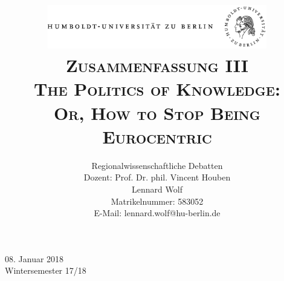 \documentclass[a4paper, 12pt]{article}
\date{\vspace{-3ex}}
\begin{document}
\title{\vspace{5ex}
	\includegraphics*[bb=0 0 720 200, width=0.72\textwidth]{ErstesSem/images/hu_logo.png}\\
	\vspace{30pt}
	\scshape\LARGE{Zusammenfassung III}\\\Large{The Politics of Knowledge:\\Or, How to Stop Being Eurocentric}\vspace{20pt}}
	


\author{Regionalwissenschaftliche Debatten\\
	\vspace{7pt}
          Dozent: Prof. Dr. phil. Vincent Houben\\\vspace{4pt}Lennard Wolf\\
        \small{Matrikelnummer: 583052}\\
        \small{E-Mail: lennard.wolf@hu-berlin.de}}


\maketitle

\vspace{\fill}

\begin{minipage}[]{0.92\textwidth}
    \centering
    \onehalfspacing
    \large   
    08. Januar 2018\\
    Wintersemester 17/18

    \vspace{-20mm} 
\end{minipage}%
\thispagestyle{empty}
\newpage
\setcounter{page}{1}
\end{document}
